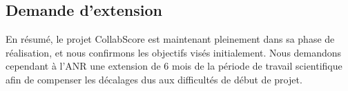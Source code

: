 \documentclass[11pt]{article}
\begin{document}
\subsection{Demande d'extension}

En résumé, le projet CollabScore est maintenant pleinement dans sa phase de réalisation, 
et nous confirmons les objectifs visés initialement. Nous demandons 
cependant à l'ANR une extension de 6 mois de la période de travail scientifique afin
de compenser les décalages dus aux difficultés de début de projet.
 
\end{document}
